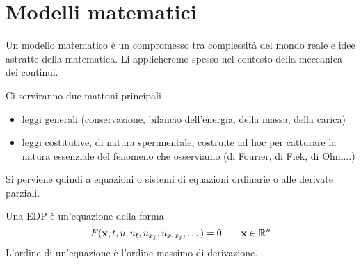 \chapter{Modelli matematici}


Un modello matematico è un compromesso tra complessità del mondo reale e idee astratte della matematica. Li applicheremo spesso nel contesto della meccanica dei continui.

Ci serviranno due mattoni principali
\begin{itemize}
    \item leggi generali (conservazione, bilancio dell'energia, della massa, della carica)
    \item leggi costitutive, di natura sperimentale, costruite ad hoc per catturare la natura essenziale del fenomeno che osserviamo (di Fourier, di Fiek, di Ohm...)
\end{itemize}

Si perviene quindi a equazioni o sistemi di equazioni ordinarie o alle derivate parziali.

Una EDP è un'equazione della forma
\begin{equation*}
    F(\mathbf{x},t,u,u_{t},u_{x_{j}},u_{x_{i} x_{j}},\dotsc)=0 \qquad \mathbf{x}\in \mathbb{R} ^{n}
\end{equation*}
L'ordine di un'equazione è l'ordine massimo di derivazione.


